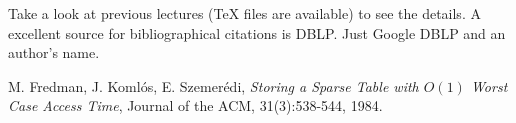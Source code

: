 \documentclass[11pt]{article}
\begin{document}
Take a look at previous lectures (TeX files are available) to see the
details. A excellent source for bibliographical citations is
DBLP. Just Google DBLP and an author's name.


%


\begin{thebibliography}{77}

M. Fredman, J. Koml\'{o}s, E. Szemer\'{e}di,
\emph{Storing a Sparse Table with $O(1)$ Worst Case Access Time},
Journal of the ACM, 31(3):538-544, 1984.

\end{thebibliography}
\end{document}
